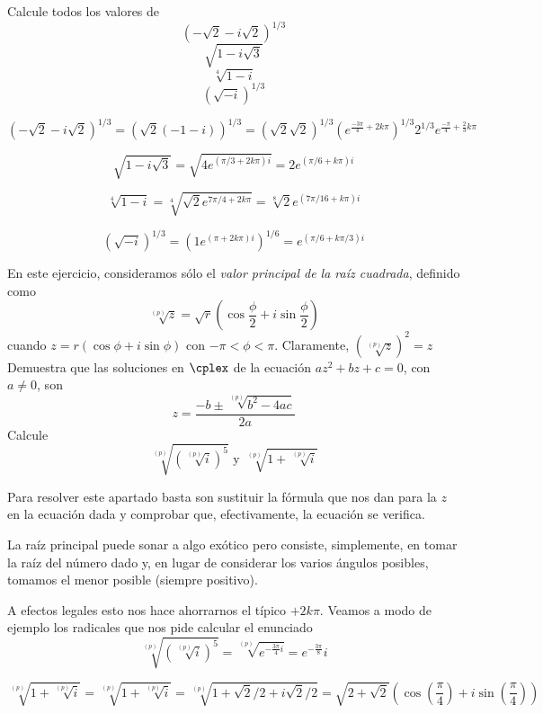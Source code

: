 \begin{problem}[10]
Calcule todos los valores de
\ppart
\[\left(-\sqrt{2}-i\sqrt{2}\right)^{1/3}\]
\ppart
\[\sqrt{1-i\sqrt{3}}\]
\ppart
\[\sqrt[4]{1-i}\]
\ppart
\[\left(\sqrt{-i}\right)^{1/3}\]

\solution

\spart
\[\left(-\sqrt{2}-i\sqrt{2}\right)^{1/3}=\left(\sqrt{2}(-1-i)\right)^{1/3}=(\sqrt{2}\sqrt{2})^{1/3}\left(e^{\frac{-3\pi}{4}+2k\pi}\right)^{1/3}2^{1/3}e^{\frac{-\pi}{4}+\frac{2}{3}k\pi}\]

\spart
\[\sqrt{1-i\sqrt{3}} = \sqrt{4e^{(\pi/3+2k\pi)i}}=2e^{(\pi/6+k\pi)i}\]

\spart
\[\sqrt[4]{1-i} = \sqrt[4]{\sqrt{2}e^{7\pi/4+2k\pi}} = \sqrt[8]{2}e^{(7\pi/16 + k\pi )i}\]

\spart

\[\left(\sqrt{-i}\right)^{1/3} = \left(1e^{(\pi+2k\pi)i}\right)^{1/6} = e^{(\pi/6+k\pi/3)i}\]
\end{problem}

\begin{problem}[11]
En este ejercicio, consideramos sólo el \textit{valor principal de la raíz cuadrada}, definido como
\[\sqrt[(p)]{z}=\sqrt{r}\left(\cos\frac{\phi}{2}+i\sin\frac{\phi}{2}\right)\]
cuando $z=r(\cos\phi+i\sin\phi)$ con $-\pi < \phi < \pi$. Claramente, $\left( \sqrt[(p)]{z} \right)^2=z$
\ppart Demuestra que las soluciones en $\cplex$ de la ecuación $az^2+bz+c=0$, con $a\neq 0$, son
\[z=\frac{-b\pm \sqrt[(p)]{b^2-4ac}}{2a}\]
\ppart
Calcule
\[\sqrt[(p)]{\left(\sqrt[(p)]{i}\right)^5} \text { y } \sqrt[(p)]{1+\sqrt[(p)]{i}}\]
\solution

\spart
Para resolver este apartado basta son sustituir la fórmula que nos dan para la $z$ en la ecuación dada y comprobar que, efectivamente, la ecuación se verifica.

\spart
La raíz principal puede sonar a algo exótico pero consiste, simplemente, en tomar la raíz del número dado y, en lugar de considerar los varios ángulos posibles, tomamos el menor posible (siempre positivo).

A efectos legales esto nos hace ahorrarnos el típico $+2k\pi$. Veamos a modo de ejemplo los radicales que nos pide calcular el enunciado
\[\sqrt[(p)]{\left( \sqrt[(p)]{i}\right)^5} = \sqrt[(p)]{e^{-\frac{3\pi}{4}i}} = e^{-\frac{3\pi}{8}}i\]

\[\sqrt[(p)]{1+\sqrt[(p)]{i}} = \sqrt[(p)]{1+\sqrt[(p)]{i}} = \sqrt[(p)]{1+\sqrt{2}/2+i\sqrt{2}/2} = \sqrt{2+\sqrt{2}}\left( \cos\left(\frac{π}{4}\right)+i\sin\left(\frac{π}{4}\right)\right)\]
\end{problem}

